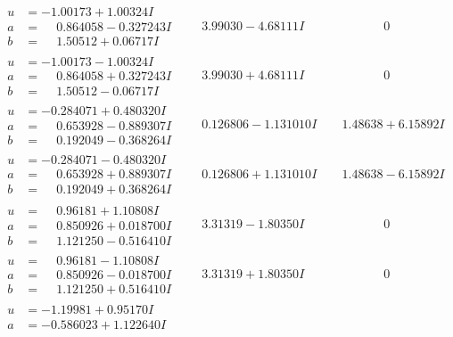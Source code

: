 \documentclass[1p]{elsarticle_modified}
\theoremstyle{definition}
\begin{document}
$$\begin{array}{c|c|c}
\begin{aligned}
u &= -1.00173 + 1.00324 I \\
a &= \phantom{-}0.864058 - 0.327243 I \\
b &= \phantom{-}1.50512 + 0.06717 I\end{aligned}
 & \phantom{-}3.99030 - 4.68111 I & \phantom{-0.000000 } 0 \\ \hline\begin{aligned}
u &= -1.00173 - 1.00324 I \\
a &= \phantom{-}0.864058 + 0.327243 I \\
b &= \phantom{-}1.50512 - 0.06717 I\end{aligned}
 & \phantom{-}3.99030 + 4.68111 I & \phantom{-0.000000 } 0 \\ \hline\begin{aligned}
u &= -0.284071 + 0.480320 I \\
a &= \phantom{-}0.653928 - 0.889307 I \\
b &= \phantom{-}0.192049 - 0.368264 I\end{aligned}
 & \phantom{-}0.126806 - 1.131010 I & \phantom{-}1.48638 + 6.15892 I \\ \hline\begin{aligned}
u &= -0.284071 - 0.480320 I \\
a &= \phantom{-}0.653928 + 0.889307 I \\
b &= \phantom{-}0.192049 + 0.368264 I\end{aligned}
 & \phantom{-}0.126806 + 1.131010 I & \phantom{-}1.48638 - 6.15892 I \\ \hline\begin{aligned}
u &= \phantom{-}0.96181 + 1.10808 I \\
a &= \phantom{-}0.850926 + 0.018700 I \\
b &= \phantom{-}1.121250 - 0.516410 I\end{aligned}
 & \phantom{-}3.31319 - 1.80350 I & \phantom{-0.000000 } 0 \\ \hline\begin{aligned}
u &= \phantom{-}0.96181 - 1.10808 I \\
a &= \phantom{-}0.850926 - 0.018700 I \\
b &= \phantom{-}1.121250 + 0.516410 I\end{aligned}
 & \phantom{-}3.31319 + 1.80350 I & \phantom{-0.000000 } 0 \\ \hline\begin{aligned}
u &= -1.19981 + 0.95170 I \\
a &= -0.586023 + 1.122640 I \\

\end{aligned}
\end{array}$$
\end{document}
